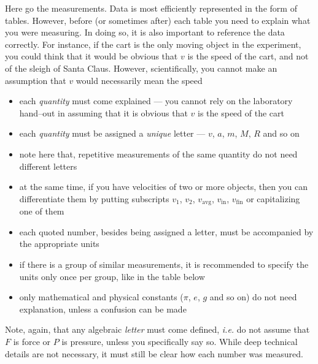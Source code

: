 \documentclass[epsfig,12pt]{article}
\begin{document}
	Here go the measurements.
	Data is most efficiently represented in the form of tables.
	However, before (or sometimes after) each table you need to explain what you were measuring.
	In doing so, it is also important to reference the data correctly.
	For instance, if the cart is the only moving object in the experiment, you could think
	that it would be obvious that $ v $ is the speed of the cart, and not of the sleigh of Santa Claus.
	However, scientifically, you cannot make an assumption that $ v $ would necessarily mean the speed
\begin{itemize}
\item
	each \emph{quantity} must come explained --- you cannot rely on the laboratory hand--out in assuming
	that it is obvious that $ v $ is the speed of the cart

\item
	each \emph{quantity} must be assigned a \emph{unique} letter --- $ v $, $ a $, $ m $, $ M $, $ R $ and so on

\item
	note here that, repetitive measurements of the same quantity do not need different letters

\item
	at the same time, if you have velocities of two or more objects, then you can differentiate
	them by putting subscripts $ v_1 $, $ v_2 $, $ v_\text{avg} $, $ v_\text{in} $, $ v_\text{fin} $ or capitalizing one of them

\item
	each quoted number, besides being assigned a letter, must be accompanied by the appropriate units

\item
	if there is a group of similar measurements, it is recommended to specify the units
	only once per group, like in the table below

\item
	only mathematical and physical constants ($ \pi $, $ e $, $ g $ and so on) do not need explanation, unless a confusion can be made
\end{itemize}

	Note, again, that any algebraic \emph{letter} must come defined, \emph{i.e.} do not assume that $ F $ is force or $ P $ is pressure,
	unless you specifically say so.
	While deep technical details are not necessary, it must still be clear how each number was measured.
	
\end{document}

